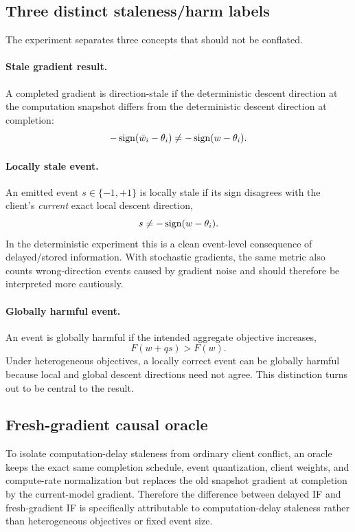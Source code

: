 \subsection{Three distinct staleness/harm labels}

The experiment separates three concepts that should not be conflated.

\paragraph{Stale gradient result.}
A completed gradient is direction-stale if the deterministic descent direction at the computation snapshot differs from the deterministic descent direction at completion:
\begin{equation}
  -\operatorname{sign}(\bar w_i-\theta_i)
  \neq
  -\operatorname{sign}(w-\theta_i).
\end{equation}

\paragraph{Locally stale event.}
An emitted event $s\in\{-1,+1\}$ is locally stale if its sign disagrees with the client's \emph{current} exact local descent direction,
\begin{equation}
  s\neq-\operatorname{sign}(w-\theta_i).
\end{equation}
In the deterministic experiment this is a clean event-level consequence of delayed/stored information. With stochastic gradients, the same metric also counts wrong-direction events caused by gradient noise and should therefore be interpreted more cautiously.

\paragraph{Globally harmful event.}
An event is globally harmful if the intended aggregate objective increases,
\begin{equation}
  F(w+qs)>F(w).
\end{equation}
Under heterogeneous objectives, a locally correct event can be globally harmful because local and global descent directions need not agree. This distinction turns out to be central to the result.

\subsection{Fresh-gradient causal oracle}

To isolate computation-delay staleness from ordinary client conflict, an oracle keeps the exact same completion schedule, event quantization, client weights, and compute-rate normalization but replaces the old snapshot gradient at completion by the current-model gradient. Therefore the difference between delayed IF and fresh-gradient IF is specifically attributable to computation-delay staleness rather than heterogeneous objectives or fixed event size.

